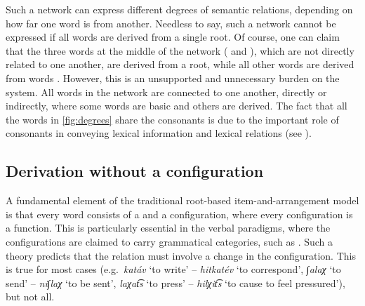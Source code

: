 \documentclass[output=paper,
modfonts
]{LSP/langsci}
\begin{document}
Such a network can express different degrees of semantic relations,
depending on how far one word is from another. Needless to say, such a
network cannot be expressed if all words are derived from a single root.
Of course, one can claim that the three words at the middle of the network (  and ),
which are not directly related to one another, are derived from a root,
while all other words are derived from words \citep{McCarthy1979a, arad2005a}.
However, this is an unsupported and unnecessary burden on the system.
All words in the network are connected to one another, directly or
indirectly, where some words are basic and others are derived. The fact
that all the words in \cref{fig:degrees} share the  consonants is due to the
important role of consonants in conveying lexical information and
lexical relations (see ).

\subsection{Derivation without a configuration} 

A fundamental element of the traditional root-based item-and-arrangement
model is that every word consists of a  and a configuration, where
every configuration is a function. This is particularly essential in the
verbal paradigms, where the configurations are claimed to carry
grammatical categories, such as  \citep{doron2003a, arad2005a}.
Such a theory predicts that the  relation must involve a change
in the configuration. This is true for most cases (e.g.\ \emph{katáv} `to
write' -- \emph{hitkatév} `to correspond', \emph{∫alaχ} `to send' --
\emph{ni∫laχ} `to be sent', \emph{laχat͡s} `to press' -- \emph{hilχit͡s}
`to cause to feel pressured'), but not all.
\end{document}
